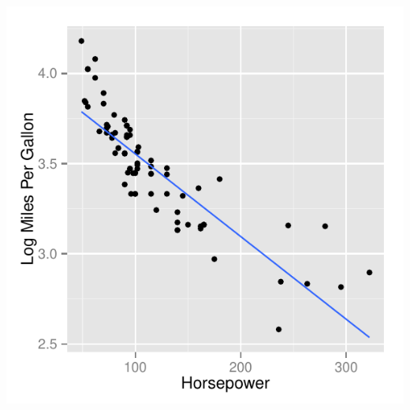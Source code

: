 \documentclass{article}\usepackage[]{graphicx}\usepackage[]{color}
\makeatletter
\def\maxwidth{ %
  \ifdim\Gin@nat@width>\linewidth
    \linewidth
  \else
    \Gin@nat@width
  \fi
}
\newenvironment{knitrout}{}{} %
\makeatother
\begin{document}
\begin{knitrout}
{\centering \includegraphics[width=\maxwidth]{figure/1a2-2} 

}



\end{knitrout}
\end{document}
